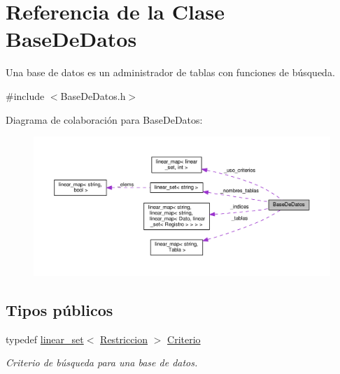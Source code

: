 \hypertarget{classBaseDeDatos}{\section{Referencia de la Clase Base\-De\-Datos}
\label{classBaseDeDatos}
}


Una base de datos es un administrador de tablas con funciones de búsqueda.  




{\ttfamily \#include $<$Base\-De\-Datos.\-h$>$}



Diagrama de colaboración para Base\-De\-Datos\-:\nopagebreak
\begin{figure}[H]
\begin{center}
\leavevmode
\includegraphics[width=350pt]{classBaseDeDatos__coll__graph}
\end{center}
\end{figure}
\subsection*{Tipos públicos}
\begin{DoxyCompactItemize}
\item 
\hypertarget{classBaseDeDatos_a6742a222e87623bc92a810a693fb337b}{typedef \hyperlink{classlinear__set}{linear\-\_\-set}$<$ \hyperlink{classRestriccion}{Restriccion} $>$ \hyperlink{classBaseDeDatos_a6742a222e87623bc92a810a693fb337b}{Criterio}}\label{classBaseDeDatos_a6742a222e87623bc92a810a693fb337b}

\begin{DoxyCompactList}\small\item\em Criterio de búsqueda para una base de datos. \end{DoxyCompactList}\end{DoxyCompactItemize}
